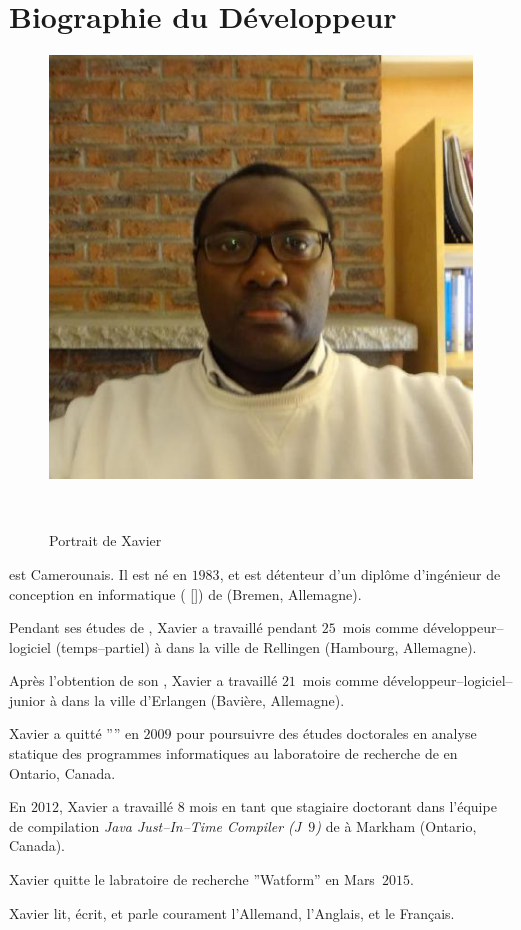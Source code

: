 \vspace{-1.1em}
\section{Biographie du D\'eveloppeur}\label{chap:biography}
\vspace{-0.9em}
\begin{figure}[!htpb]
\centering
\includegraphics[scale=0.35]{../images/XavierNOUNDOU-2}
\caption{Portrait de Xavier}~\label{fig:xaviernoumbis}
\end{figure}

 est Camerounais.
Il est n\'e en $1983$, et est d\'etenteur d'un
dipl\^ome d'ing\'enieur de conception en informatique
(\emph{\diplominformatiker} [\diplinf]) de 
(Bremen, Allemagne).

Pendant ses \'etudes de \diplinf,
Xavier a travaill\'e pendant $25$~mois comme
d\'eveloppeur--logiciel (temps--partiel) \`a
\company{\bergmann} dans la ville de Rellingen
(Hambourg, Allemagne).

Apr\`es l'obtention de son \diplinf, Xavier a travaill\'e
$21$~mois comme d\'eveloppeur--logiciel--junior \`a
\company{\siemens} dans la ville d'Erlangen (Bavi\`ere, Allemagne).

Xavier a quitt\'e ''\siemens'' en $2009$ pour poursuivre
des \'etudes doctorales en analyse statique des programmes
informatiques au laboratoire de recherche 
de  en
Ontario, Canada.

En $2012$, Xavier a travaill\'e $8$ mois en tant
que stagiaire doctorant dans l'\'equipe de compilation 
\emph{Java Just--In--Time Compiler (J~$9$)} de
 \`a Markham (Ontario, Canada).

Xavier quitte le labratoire de recherche ''Watform''
en Mars~$2015$.

Xavier lit, \'ecrit, et parle courament l'Allemand,
l'Anglais, et le Fran\c{c}ais.
